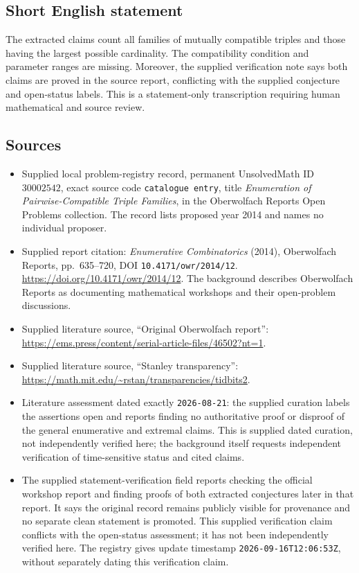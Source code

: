 \documentclass[11pt]{article}
\begin{document}
\subsection{Short English statement}
The extracted claims count all families of mutually compatible triples and those having the largest possible cardinality. The compatibility condition and parameter ranges are missing. Moreover, the supplied verification note says both claims are proved in the source report, conflicting with the supplied conjecture and open-status labels. This is a statement-only transcription requiring human mathematical and source review.
\subsection{Sources}
\begin{itemize}
\item Supplied local problem-registry record, permanent UnsolvedMath ID \(30002542\), exact source code \texttt{catalogue entry}, title \emph{Enumeration of Pairwise-Compatible Triple Families}, in the Oberwolfach Reports Open Problems collection. The record lists proposed year 2014 and names no individual proposer.
\item Supplied report citation: \emph{Enumerative Combinatorics} (2014), Oberwolfach Reports, pp.\ 635--720, DOI \texttt{10.4171/owr/2014/12}. \url{https://doi.org/10.4171/owr/2014/12}. The background describes Oberwolfach Reports as documenting mathematical workshops and their open-problem discussions.
\item Supplied literature source, ``Original Oberwolfach report'': \url{https://ems.press/content/serial-article-files/46502?nt=1}.
\item Supplied literature source, ``Stanley transparency'': \url{https://math.mit.edu/~rstan/transparencies/tidbits2}.
\item Literature assessment dated exactly \texttt{2026-08-21}: the supplied curation labels the assertions open and reports finding no authoritative proof or disproof of the general enumerative and extremal claims. This is supplied dated curation, not independently verified here; the background itself requests independent verification of time-sensitive status and cited claims.
\item The supplied statement-verification field reports checking the official workshop report and finding proofs of both extracted conjectures later in that report. It says the original record remains publicly visible for provenance and no separate clean statement is promoted. This supplied verification claim conflicts with the open-status assessment; it has not been independently verified here. The registry gives update timestamp \texttt{2026-09-16T12:06:53Z}, without separately dating this verification claim.
\end{itemize}
\end{document}
